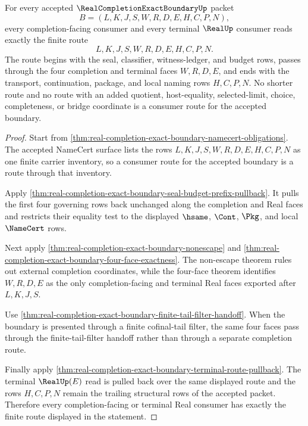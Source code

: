 \begin{theorem}
\label{thm:real-completion-exact-boundary-terminal-consumer-exactness}
For every accepted $\RealCompletionExactBoundaryUp$ packet
$$
B=(L,K,J,S,W,R,D,E,H,C,P,N),
$$
every completion-facing consumer and every terminal $\RealUp$ consumer reads exactly the finite route
$$
L,K,J,S,W,R,D,E,H,C,P,N.
$$
The route begins with the seal, classifier, witness-ledger, and budget rows, passes through the four completion and terminal faces $W,R,D,E$, and ends with the transport, continuation, package, and local naming rows $H,C,P,N$. No shorter route and no route with an added quotient, host-equality, selected-limit, choice, completeness, or bridge coordinate is a consumer route for the accepted boundary.
\end{theorem}
\begin{proof}
Start from \autoref{thm:real-completion-exact-boundary-namecert-obligations}. The accepted NameCert surface lists the rows $L,K,J,S,W,R,D,E,H,C,P,N$ as one finite carrier inventory, so a consumer route for the accepted boundary is a route through that inventory.

Apply \autoref{thm:real-completion-exact-boundary-seal-budget-prefix-pullback}. It pulls the first four governing rows back unchanged along the completion and Real faces and restricts their equality test to the displayed $\hsame$, $\Cont$, $\Pkg$, and local $\NameCert$ rows.

Next apply \autoref{thm:real-completion-exact-boundary-nonescape} and \autoref{thm:real-completion-exact-boundary-four-face-exactness}. The non-escape theorem rules out external completion coordinates, while the four-face theorem identifies $W,R,D,E$ as the only completion-facing and terminal Real faces exported after $L,K,J,S$.

Use \autoref{thm:real-completion-exact-boundary-finite-tail-filter-handoff}. When the boundary is presented through a finite cofinal-tail filter, the same four faces pass through the finite-tail-filter handoff rather than through a separate completion route.

Finally apply \autoref{thm:real-completion-exact-boundary-terminal-route-pullback}. The terminal $\RealUp(E)$ read is pulled back over the same displayed route and the rows $H,C,P,N$ remain the trailing structural rows of the accepted packet. Therefore every completion-facing or terminal Real consumer has exactly the finite route displayed in the statement.
\end{proof}

